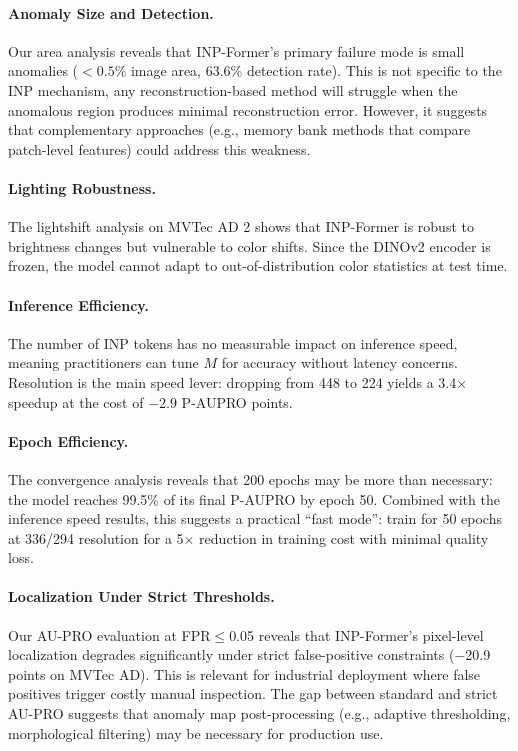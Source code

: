 \documentclass[10pt]{article} %
\begin{document}
\paragraph{Anomaly Size and Detection.} Our area analysis reveals that INP-Former's primary failure mode is small anomalies ($<0.5\%$ image area, 63.6\% detection rate). This is not specific to the INP mechanism, any reconstruction-based method will struggle when the anomalous region produces minimal reconstruction error. However, it suggests that complementary approaches (e.g., memory bank methods that compare patch-level features) could address this weakness.

\paragraph{Lighting Robustness.} The lightshift analysis on MVTec AD 2 shows that INP-Former is robust to brightness changes but vulnerable to color shifts. Since the DINOv2 encoder is frozen, the model cannot adapt to out-of-distribution color statistics at test time.

\paragraph{Inference Efficiency.} The number of INP tokens has no measurable impact on inference speed, meaning practitioners can tune $M$ for accuracy without latency concerns. Resolution is the main speed lever: dropping from 448 to 224 yields a 3.4$\times$ speedup at the cost of $-2.9$ P-AUPRO points.

\paragraph{Epoch Efficiency.} The convergence analysis reveals that 200 epochs may be more than necessary: the model reaches 99.5\% of its final P-AUPRO by epoch 50. Combined with the inference speed results, this suggests a practical ``fast mode'': train for 50 epochs at 336/294 resolution for a 5$\times$ reduction in training cost with minimal quality loss.

\paragraph{Localization Under Strict Thresholds.} Our AU-PRO evaluation at FPR$\leq$0.05 reveals that INP-Former's pixel-level localization degrades significantly under strict false-positive constraints ($-$20.9 points on MVTec AD). This is relevant for industrial deployment where false positives trigger costly manual inspection. The gap between standard and strict AU-PRO suggests that anomaly map post-processing (e.g., adaptive thresholding, morphological filtering) may be necessary for production use.
\end{document}
